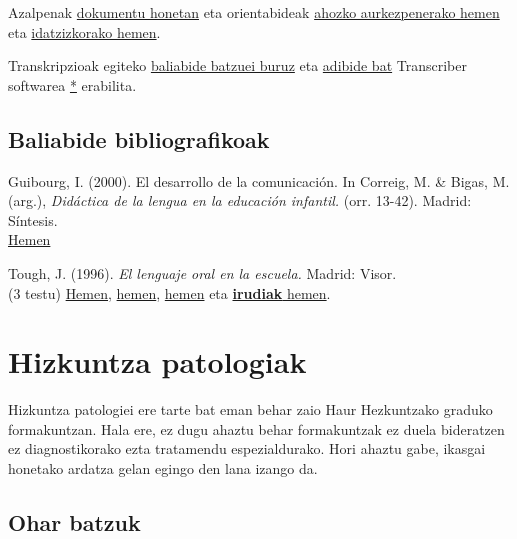 \documentclass[
]{book}
\begin{document}
Azalpenak \href{../beste/Proiektua/Deskribapena-dokumentua.pdf}{dokumentu honetan} eta orientabideak \href{../beste/Proiektua/Proiektua-Orientabideak_ahozko_aurkezpenerako.pdf}{ahozko aurkezpenerako hemen} eta \href{../beste/Proiektua/Proiektua-Orientabideak_idatzizko_lanerako.pdf}{idatzizkorako hemen}.

Transkripzioak egiteko \href{http://bosgarrena.blogspot.com/2019/10/transkripzioak-egiteko-erreminta-libre.html}{baliabide batzuei buruz} eta \href{../beste/Proiektua/senior_.html}{adibide bat} Transcriber softwarea \href{http://trans.sourceforge.net/en/presentation.php}{*} erabilita.

\hypertarget{baliabide-bibliografikoak}{%
\section*{Baliabide bibliografikoak}\label{baliabide-bibliografikoak}}

Guibourg, I. (2000). El desarrollo de la comunicación. In Correig, M. \& Bigas, M. (arg.), \emph{Didáctica de la lengua en la educación infantil.} (orr. 13-42). Madrid: Síntesis.\\
\href{../beste/Proiektua/GUIBOURG_El_desarrollo_de_la_comunicacion.pdf}{Hemen}

Tough, J. (1996). \emph{El lenguaje oral en la escuela.} Madrid: Visor.\\
(3 testu)
\href{../beste/Proiektua/TOUGH_El\%20uso\%20del\%20lenguaje\%20en\%20los\%20ninos.pdf}{Hemen}, \href{../beste/Proiektua/TOUGH_como\%20hacer\%20una\%20valoracion\%20del\%20uso\%20del\%20lenguaje\%20en\%20el\%20nino.pdf}{hemen}, \href{../beste/Proiektua/TOUGH_utilizacion\%20de\%20los\%20cuadernillos\%20de\%20dibujos.pdf}{hemen} eta \href{../beste/Proiektua/TOUGH_Katutxo_beltza-irudiak.pdf}{\textbf{irudiak} hemen}.

\hypertarget{hizkuntza-patologiak}{%
\chapter{Hizkuntza patologiak}\label{hizkuntza-patologiak}}

Hizkuntza patologiei ere tarte bat eman behar zaio Haur Hezkuntzako graduko formakuntzan. Hala ere, ez dugu ahaztu behar formakuntzak ez duela bideratzen ez diagnostikorako ezta tratamendu espezialdurako. Hori ahaztu gabe, ikasgai honetako ardatza gelan egingo den lana izango da.

\hypertarget{ohar-batzuk}{%
\section{Ohar batzuk}\label{ohar-batzuk}}
\end{document}
